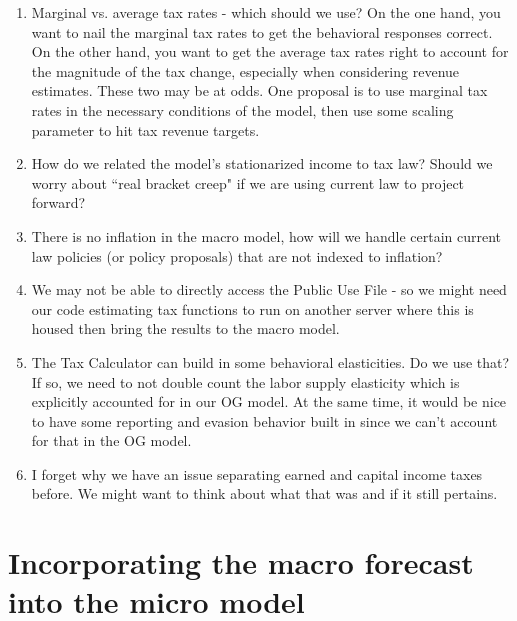 \documentclass[letterpaper,12pt]{article}
\theoremstyle{definition}
\begin{document}
\begin{spacing}{1.5}
\begin{enumerate}
\item Marginal vs. average tax rates - which should we use?  On the one hand, you want to nail the marginal tax rates to get the behavioral responses correct. On the other hand, you want to get the average tax rates right to account for the magnitude of the tax change, especially when considering revenue estimates.  These two may be at odds.  One proposal is to use marginal tax rates in the necessary conditions of the model, then use some scaling parameter to hit tax revenue targets.
\item How do we related the model's stationarized income to tax law?  Should we worry about ``real bracket creep" if we are using current law to project forward?  
\item There is no inflation in the macro model, how will we handle certain current law policies (or policy proposals) that are not indexed to inflation?
\item We may not be able to directly access the Public Use File - so we might need our code estimating tax functions to run on another server where this is housed then bring the results to the macro model.
\item  The Tax Calculator can build in some behavioral elasticities.  Do we use that?  If so, we need to not double count the labor supply elasticity which is explicitly accounted for in our OG model.  At the same time, it would be nice to have some reporting and evasion behavior built in since we can't account for that in the OG model.
\item I forget why we have an issue separating earned and capital income taxes before.  We might want to think about what that was and if it still pertains.
\end{enumerate}


\section{Incorporating the macro forecast into the micro model}



\end{spacing}
\end{document}
